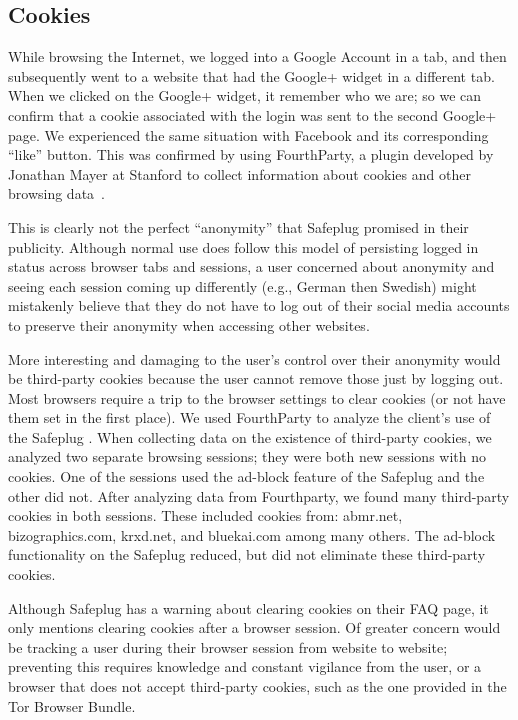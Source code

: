 \documentclass[conference]{IEEEtran}
\begin{document}
\subsection{Cookies}  
While browsing the Internet, we logged into a Google Account in a tab, and then subsequently went to a website that had the Google+ widget in a different tab.  When we clicked on the Google+ widget, it remember who we are; so we can confirm that a cookie associated with the login was sent to the second Google+ page.  We experienced the same situation with Facebook and its corresponding ``like'' button.  This was confirmed by using FourthParty, a plugin developed by Jonathan Mayer at Stanford to collect information about cookies and other browsing data~\cite{fourthparty}.

This is clearly not the perfect ``anonymity'' that Safeplug promised in their publicity.  Although normal use does follow this model of persisting logged in status across browser tabs and sessions, a user concerned about anonymity and seeing each session coming up differently (e.g., German then Swedish) might mistakenly believe that they do not have to log out of their social media accounts to preserve their anonymity when accessing other websites.

More interesting and damaging to the user's control over their anonymity would be third-party cookies because the user cannot remove those just by logging out.  Most browsers require a trip to the browser settings to clear cookies (or not have them set in the first place).  We used FourthParty to analyze the client's use of the Safeplug \cite{fourthparty}.  When collecting data on the existence of third-party cookies, we analyzed two separate browsing sessions; they were both new sessions with no cookies.  One of the sessions used the ad-block feature of the Safeplug and the other did not.  After analyzing data from Fourthparty, we found many third-party cookies in both sessions.  These included cookies from: abmr.net, bizographics.com, krxd.net, and bluekai.com among many others.  The ad-block functionality on the Safeplug reduced, but did not eliminate these third-party cookies.

Although Safeplug has a warning about clearing cookies on their FAQ page, it only mentions clearing cookies after a browser session.  Of greater concern would be tracking a user during their browser session from website to website; preventing this requires knowledge and constant vigilance from the user, or a browser that does not accept third-party cookies, such as the one provided in the Tor Browser Bundle.
\end{document}
